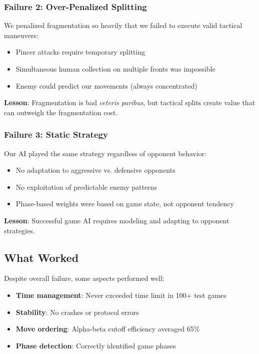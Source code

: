 \documentclass[11pt,a4paper]{article}
\begin{document}
\subsubsection{Failure 2: Over-Penalized Splitting}

\begin{tcolorbox}[colback=orange!5, colframe=orange!50!black, title=\textbf{Critical Issue: Anti-Fragmentation Obsession}]
We penalized fragmentation so heavily that we failed to execute valid tactical maneuvers:
\begin{itemize}
    \item Pincer attacks require temporary splitting
    \item Simultaneous human collection on multiple fronts was impossible
    \item Enemy could predict our movements (always concentrated)
\end{itemize}
\textbf{Lesson}: Fragmentation is bad \emph{ceteris paribus}, but tactical splits create value that can outweigh the fragmentation cost.
\end{tcolorbox}

\subsubsection{Failure 3: Static Strategy}

\begin{tcolorbox}[colback=yellow!5, colframe=yellow!50!black, title=\textbf{Critical Issue: No Opponent Modeling}]
Our AI played the same strategy regardless of opponent behavior:
\begin{itemize}
    \item No adaptation to aggressive vs. defensive opponents
    \item No exploitation of predictable enemy patterns
    \item Phase-based weights were based on game state, not opponent tendency
\end{itemize}
\textbf{Lesson}: Successful game AI requires modeling and adapting to opponent strategies.
\end{tcolorbox}

\subsection{What Worked}

Despite overall failure, some aspects performed well:

\begin{itemize}
    \item \textbf{Time management}: Never exceeded time limit in 100+ test games
    \item \textbf{Stability}: No crashes or protocol errors
    \item \textbf{Move ordering}: Alpha-beta cutoff efficiency averaged 65\%
    \item \textbf{Phase detection}: Correctly identified game phases
\end{itemize}
\end{document}
